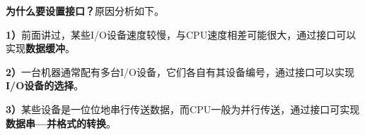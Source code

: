 {\textbf{为什么要设置接口？}}原因分析如下。

\textbf{1）}前面讲过，某些I/O设备速度较慢，与CPU速度相差可能很大，通过接口可以实现\textbf{数据缓冲}。

\textbf{2）}一台机器通常配有多台I/O设备，它们各自有其设备编号，通过接口可以实现\textbf{I/O设备的选择}。

\textbf{3）}某些设备是一位位地串行传送数据，而CPU一般为并行传送，通过接口可实现\textbf{数据串---并格式的转换}。
